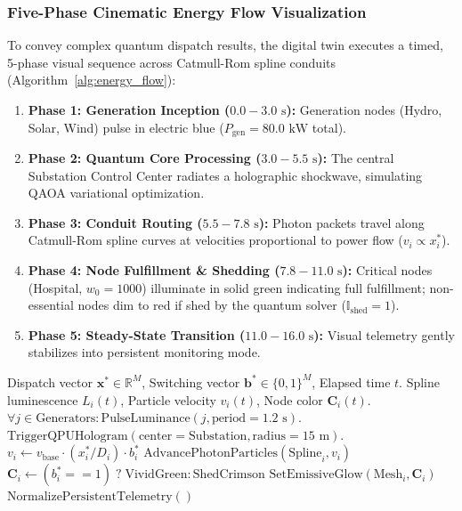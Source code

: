 \documentclass[11pt,a4paper]{article}
\theoremstyle{definition}
\theoremstyle{remark}
\begin{document}
\subsubsection{Five-Phase Cinematic Energy Flow Visualization}
To convey complex quantum dispatch results, the digital twin executes a timed, 5-phase visual sequence across Catmull-Rom spline conduits (Algorithm~\ref{alg:energy_flow}):
\begin{enumerate}
    \item \textbf{Phase 1: Generation Inception ($0.0 - 3.0\text{ s}$):} Generation nodes (Hydro, Solar, Wind) pulse in electric blue ($P_{\text{gen}} = 80.0\text{ kW}$ total).
    \item \textbf{Phase 2: Quantum Core Processing ($3.0 - 5.5\text{ s}$):} The central Substation Control Center radiates a holographic shockwave, simulating QAOA variational optimization.
    \item \textbf{Phase 3: Conduit Routing ($5.5 - 7.8\text{ s}$):} Photon packets travel along Catmull-Rom spline curves at velocities proportional to power flow ($v_i \propto x_i^*$).
    \item \textbf{Phase 4: Node Fulfillment \& Shedding ($7.8 - 11.0\text{ s}$):} Critical nodes (Hospital, $w_0 = 1000$) illuminate in solid green indicating full fulfillment; non-essential nodes dim to red if shed by the quantum solver ($\mathbb{I}_{\text{shed}} = 1$).
    \item \textbf{Phase 5: Steady-State Transition ($11.0 - 16.0\text{ s}$):} Visual telemetry gently stabilizes into persistent monitoring mode.
\end{enumerate}

\begin{algorithm}[H]
\caption{Five-Phase Cyber-Physical Energy Flow Animation}
\label{alg:energy_flow}
\begin{algorithmic}[1]
\REQUIRE Dispatch vector $\mathbf{x}^* \in \mathbb{R}^M$, Switching vector $\mathbf{b}^* \in \{0, 1\}^M$, Elapsed time $t$.
\ENSURE Spline luminescence $L_i(t)$, Particle velocity $v_i(t)$, Node color $\mathbf{C}_i(t)$.
    \STATE $\forall j \in \text{Generators}: \text{PulseLuminance}(j, \text{period}=1.2\text{ s})$.
    \STATE $\text{TriggerQPUHologram}(\text{center}=\text{Substation}, \text{radius}=15\text{ m})$.
        \STATE $v_i \leftarrow v_{\text{base}} \cdot (x_i^* / D_i) \cdot b_i^*$
        \STATE $\text{AdvancePhotonParticles}(\text{Spline}_i, v_i)$
    \ENDFOR
{}
        \STATE $\mathbf{C}_i \leftarrow (b_i^* == 1) \;?\; \text{VividGreen} : \text{ShedCrimson}$
        \STATE $\text{SetEmissiveGlow}(\text{Mesh}_i, \mathbf{C}_i)$
    \ENDFOR
\ELSE
    \STATE $\text{NormalizePersistentTelemetry}()$
\ENDIF
\end{algorithmic}
\end{algorithm}
\end{document}
